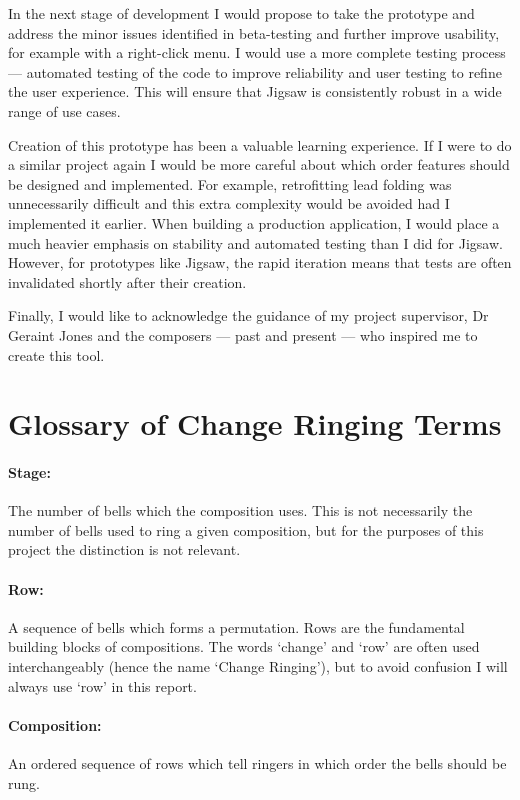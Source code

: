 \documentclass[12pt]{article}
\begin{document}
In the next stage of development I would propose to take the prototype and address the minor issues
identified in beta-testing and further improve usability, for example with a right-click menu. I
would use a more complete testing process --- automated testing of the code to improve reliability
and user testing to refine the user experience.  This will ensure that Jigsaw is consistently
robust in a wide range of use cases.

Creation of this prototype has been a valuable learning experience.  If I were to do a similar
project again I would be more careful about which order features should be designed and implemented.
For example, retrofitting lead folding was unnecessarily difficult and this extra complexity would
be avoided had I implemented it earlier.  When building a production application, I would place a
much heavier emphasis on stability and automated testing than I did for Jigsaw.  However, for
prototypes like Jigsaw, the rapid iteration means that tests are often invalidated shortly after
their creation.

Finally, I would like to acknowledge the guidance of my project supervisor, Dr Geraint Jones and the
composers --- past and present --- who inspired me to create this tool.



\pagebreak

\section{Glossary of Change Ringing Terms}\label{sec:glossary}

\paragraph{Stage:} The number of bells which the composition uses.  This is not necessarily the
number of bells used to ring a given composition, but for the purposes of this project the
distinction is not relevant.

\paragraph{Row:} A sequence of bells which forms a permutation.  Rows are the fundamental building
blocks of compositions.  The words `change' and `row' are often used interchangeably (hence the name
`Change Ringing'), but to avoid confusion I will always use `row' in this report.

\paragraph{Composition:} An ordered sequence of rows which tell ringers in which order the bells
should be rung.
\end{document}
